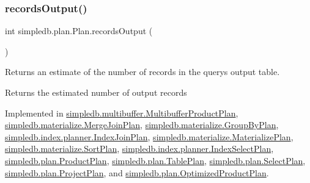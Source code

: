 \mbox{\label{interfacesimpledb_1_1plan_1_1Plan_a187e06657d356c80a7f743d7ff8fd257}} 
\subsubsection{\texorpdfstring{records\+Output()}{recordsOutput()}}
{\footnotesize\ttfamily int simpledb.\+plan.\+Plan.\+records\+Output (\begin{DoxyParamCaption}{ }\end{DoxyParamCaption})}

Returns an estimate of the number of records in the query\textquotesingle{}s output table. \begin{DoxyReturn}{Returns}
the estimated number of output records 
\end{DoxyReturn}


Implemented in \hyperlink{classsimpledb_1_1multibuffer_1_1MultibufferProductPlan_a45cef849c8ac76cce183b7d9909929c1}{simpledb.\+multibuffer.\+Multibuffer\+Product\+Plan}, \hyperlink{classsimpledb_1_1materialize_1_1MergeJoinPlan_a4491095a660740e251d50bd33628dc2d}{simpledb.\+materialize.\+Merge\+Join\+Plan}, \hyperlink{classsimpledb_1_1materialize_1_1GroupByPlan_aac232f69ae5b322754b34f83c4813883}{simpledb.\+materialize.\+Group\+By\+Plan}, \hyperlink{classsimpledb_1_1index_1_1planner_1_1IndexJoinPlan_a885b5d4ff1b8b96353d58a87417e6f5f}{simpledb.\+index.\+planner.\+Index\+Join\+Plan}, \hyperlink{classsimpledb_1_1materialize_1_1MaterializePlan_a3e3d3cdd3bff924c476e7943d7fe70e7}{simpledb.\+materialize.\+Materialize\+Plan}, \hyperlink{classsimpledb_1_1materialize_1_1SortPlan_a1bcfa71f5e5f33c4bd484d68b6121fbd}{simpledb.\+materialize.\+Sort\+Plan}, \hyperlink{classsimpledb_1_1index_1_1planner_1_1IndexSelectPlan_abbbff69541cb3700bf74674f851297bc}{simpledb.\+index.\+planner.\+Index\+Select\+Plan}, \hyperlink{classsimpledb_1_1plan_1_1ProductPlan_a5fce0180a7e282d587fc254dd302d009}{simpledb.\+plan.\+Product\+Plan}, \hyperlink{classsimpledb_1_1plan_1_1TablePlan_ab55d872332c11cd882240f8b1851abc6}{simpledb.\+plan.\+Table\+Plan}, \hyperlink{classsimpledb_1_1plan_1_1SelectPlan_af68bc517292c7bd5706b191f30124a2e}{simpledb.\+plan.\+Select\+Plan}, \hyperlink{classsimpledb_1_1plan_1_1ProjectPlan_ae62939db691f1180bb17101d48d08f82}{simpledb.\+plan.\+Project\+Plan}, and \hyperlink{classsimpledb_1_1plan_1_1OptimizedProductPlan_acf3d4c379376683928f83fa56de38d60}{simpledb.\+plan.\+Optimized\+Product\+Plan}.

